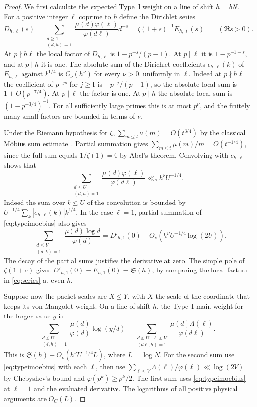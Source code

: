 \documentclass[11pt,a4paper]{article}
\numberwithin{equation}{section}
\newcommand{\SSS}{\mathfrak S}
\begin{document}
\begin{proof}
We first calculate the expected Type~I weight on a line
of shift $h=bN$. For a positive integer $\ell$ coprime to
$h$ define the Dirichlet series
\[
 D_{h,\ell}(s)=
 \sum_{\substack{d\ge1\\(d,h)=1}}
    \frac{\mu(d)\varphi(\ell)}{\varphi(d\ell)}d^{-s}
     =\zeta(1+s)^{-1}E_{h,\ell}(s)
     \qquad(\Re s>0).
\]
At $p\nmid h\ell$ the local factor of $D_{h,\ell}$
is $1-p^{-s}/(p-1)$. At $p\mid\ell$ it is $1-p^{-1-s}$,
and at $p\mid h$ it is one. The absolute sum of the
Dirichlet coefficients $e_{h,\ell}(k)$ of $E_{h,\ell}$
against $k^{1/4}$ is $O_\nu(h^\nu)$ for every $\nu>0$,
uniformly in $\ell$. Indeed at $p\nmid h\ell$ the
coefficient of $p^{-js}$ for $j\ge1$ is $-p^{-j}/(p-1)$,
so the absolute local sum is $1+O(p^{-7/4})$.
At $p\mid \ell$ the factor is one. At $p\mid h$
the absolute local sum is $(1-p^{-3/4})^{-1}$.
For all sufficiently large primes this is at most
$p^\nu$, and the finitely many small factors are bounded
in terms of $\nu$.

Under the Riemann hypothesis for $\zeta$,
$\sum_{m\le t}\mu(m)=O(t^{3/4})$ by the classical
M\"obius sum estimate~\cite{SoundararajanMobius}.
Partial summation gives
$\sum_{m\le t}\mu(m)/m=O(t^{-1/4})$, since the full
sum equals $1/\zeta(1)=0$ by Abel's theorem.
Convolving with $e_{h,\ell}$ shows that
\begin{equation}
 \sum_{\substack{d\le U\\(d,h)=1}}
       \frac{\mu(d)\varphi(\ell)}{\varphi(d\ell)}
      \ll_\nu h^\nu U^{-1/4}.
 \label{eq:typeimoebius}
\end{equation}
Indeed the sum over $k\le U$ of the convolution is
bounded by $U^{-1/4}\sum_k |e_{h,\ell}(k)|k^{1/4}$.
In the case $\ell=1$, partial summation of
\cref{eq:typeimoebius} also gives
\[
 -\sum_{\substack{d\le U\\(d,h)=1}}
      \frac{\mu(d)\log d}{\varphi(d)}
 =D'_{h,1}(0)+O_\nu(h^\nu U^{-1/4}\log(2U)).
\]
The decay of the partial sums justifies the derivative
at zero. The simple pole of $\zeta(1+s)$ gives
$D'_{h,1}(0)=E_{h,1}(0)=\SSS(h)$, by comparing the local
factors in \cref{eq:series} at even $h$.

Suppose now the packet scales are $X\le Y$, with $X$
the scale of the coordinate that keeps its von Mangoldt
weight. On a line of shift $h$, the Type~I main weight
for the larger value $y$ is
\begin{equation}
 \sum_{\substack{d\le U\\(d,h)=1}}
       \frac{\mu(d)}{\varphi(d)}\log(y/d)
 -
 \sum_{\substack{d\le U,\;\ell\le V\\(d\ell,h)=1}}
        \frac{\mu(d)\Lambda(\ell)}{\varphi(d\ell)} .
 \label{eq:typeimain}
\end{equation}
This is $\SSS(h)+O_\nu(h^\nu U^{-1/4}L)$, where
$L=\log N$. For the second sum use
\cref{eq:typeimoebius} with each $\ell$, then use
$\sum_{\ell\le V}\Lambda(\ell)/\varphi(\ell)\ll\log(2V)$
by Chebyshev's bound and $\varphi(p^k)\ge p^k/2$.
The first sum uses \cref{eq:typeimoebius} at $\ell=1$
and the evaluated derivative. The logarithms of all
positive physical arguments are $O_C(L)$.


\end{proof}
\end{document}
